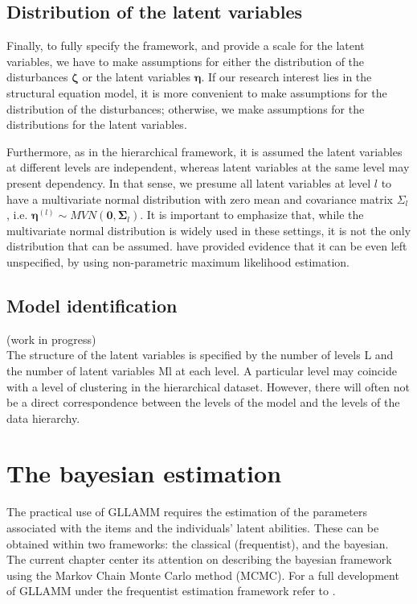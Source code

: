 \subsection{Distribution of the latent variables} \label{s_sect:dist_lv}
Finally, to fully specify the framework, and provide a scale for the latent variables, we have to make assumptions for either the distribution of the disturbances $\pmb{\zeta}$ or the latent variables $\pmb{\eta}$. If our research interest lies in the structural equation model, it is more convenient to make assumptions for the distribution of the disturbances; otherwise, we make assumptions for the distributions for the latent variables. 

Furthermore, as in the hierarchical framework, it is assumed the latent variables at different levels are independent, whereas latent variables at the same level may present dependency. In that sense, we presume all latent variables at level $l$ to have a multivariate normal distribution with zero mean and covariance matrix $\Sigma_{l}$, i.e. $\pmb{\eta}^{(l)} \sim MVN(\mathbf{0}, \pmb{\Sigma}_{l})$. It is important to emphasize that, while the multivariate normal distribution is widely used in these settings, it is not the only distribution that can be assumed. \citet{Rabe_et_al_2003a} have provided evidence that it can be even left unspecified, by using non-parametric maximum likelihood estimation.



\subsection{Model identification} \label{sect:identification}
{\color{red}(work in progress) \\
	
The structure of the latent variables is specified by the number of levels L and the number of latent variables Ml at each level. A particular level may coincide with a level of clustering in the hierarchical dataset. However, there will often not be a direct correspondence between the levels of the model and the levels of the data hierarchy.

}




\section{The bayesian estimation}


The practical use of GLLAMM requires the estimation of the parameters associated with the items and the individuals' latent abilities. These can be obtained within two frameworks: the classical (frequentist), and the bayesian. The current chapter center its attention on describing the bayesian framework using the Markov Chain Monte Carlo method (MCMC). For a full development of GLLAMM under the frequentist estimation framework refer to \citet{Rabe_et_al_2004a, Rabe_et_al_2004b, Skrondal_et_al_2004a, Rabe_et_al_2012}.



